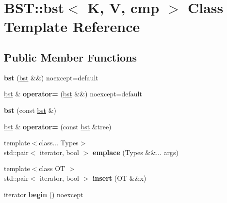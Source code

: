 \hypertarget{classBST_1_1bst}{}\section{B\+ST\+:\+:bst$<$ K, V, cmp $>$ Class Template Reference}
\label{classBST_1_1bst}
\subsection*{Public Member Functions}
\begin{DoxyCompactItemize}
\item 
\mbox{\label{classBST_1_1bst_a2e920ad809f46ab051c9f49d5108bc70}} 
{\bfseries bst} (\hyperlink{classBST_1_1bst}{bst} \&\&) noexcept=default
\item 
\mbox{\label{classBST_1_1bst_abab0876508a7ed84d1256bb0e0139af6}} 
\hyperlink{classBST_1_1bst}{bst} \& {\bfseries operator=} (\hyperlink{classBST_1_1bst}{bst} \&\&) noexcept=default
\item 
\mbox{\label{classBST_1_1bst_ae959ba0709bffaa2617a87813baa2f34}} 
{\bfseries bst} (const \hyperlink{classBST_1_1bst}{bst} \&)
\item 
\mbox{\label{classBST_1_1bst_aa96092243a0acee13f8823006ca6fd34}} 
\hyperlink{classBST_1_1bst}{bst} \& {\bfseries operator=} (const \hyperlink{classBST_1_1bst}{bst} \&tree)
\item 
\mbox{\label{classBST_1_1bst_a39b5fa926b67f6f4089e32aeb63a74b9}} 
{\footnotesize template$<$class... Types$>$ }\\std\+::pair$<$ iterator, bool $>$ {\bfseries emplace} (Types \&\&... args)
\item 
\mbox{\label{classBST_1_1bst_a415605474ad54b651f34d73c448fdba3}} 
{\footnotesize template$<$class OT $>$ }\\std\+::pair$<$ iterator, bool $>$ {\bfseries insert} (OT \&\&x)
\item 
\mbox{\label{classBST_1_1bst_a998e86071c043c562ac906197cbf015e}} 
iterator {\bfseries begin} () noexcept
\item 

\end{DoxyCompactItemize}
